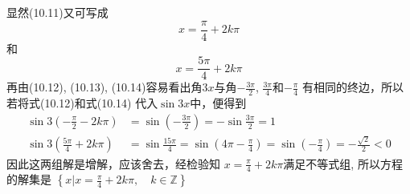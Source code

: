 \begin{solution}
显然(10.11)又可写成
\begin{equation}
  x=\frac{\pi}{4}+2k\pi
\end{equation}
和
\begin{equation}
  x=\frac{5\pi}{4}+2k\pi
\end{equation}
再由(10.12), (10.13), (10.14)容易看出角$3x$与角$-\frac{3\pi}{2}$, $\frac{3\pi}{4}$和$-\frac{\pi}{4}$
有相同的终边，所以若将式(10.12)和式(10.14)
代入$\sin3x$中，便得到
\[\begin{split}
  \sin 3\left(-\frac{\pi}{2}-2k\pi\right)&=\sin\left(-\frac{3\pi}{2}\right)=-\sin\frac{3\pi}{2}=1\\
  \sin 3\left(\frac{5\pi}{4}+2k\pi\right)&=\sin\frac{15\pi}{4}=\sin\left(4\pi-\frac{\pi}{4}\right)=\sin\left(-\frac{\pi}{4}\right)=-\frac{\sqrt{2}}{2}<0
\end{split}\]
因此这两组解是增解，应该舍去，经检验知
$x=\frac{\pi}{4}+2k\pi$满足不等式组, 
所以方程的解集是
$\left\{x\Big|x=\frac{\pi}{4}+2k\pi,\quad k\in\mathbb{Z}\right\}$








\end{solution}

